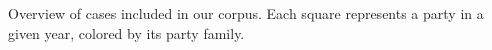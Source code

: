 Overview of cases included in our corpus. Each square represents a party in a given year, colored by its party family.